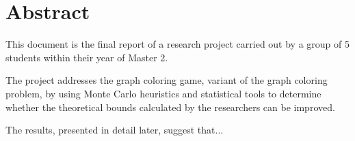 \section*{Abstract}
This document is the final report of a research project carried out by a group of 5 students within their year of Master 2.

The project addresses the graph coloring game, variant of the graph coloring problem, by using Monte Carlo heuristics and statistical tools to determine whether the theoretical bounds calculated by the researchers can be improved.

The results, presented in detail later, suggest that...
